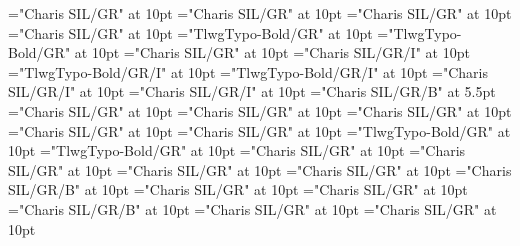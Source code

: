 \documentclass[a4paper,twoside]{article}
\begin{document}
\font\spanenetymologyentryletDatadicBody="Charis SIL/GR" at 10pt
\font\etymologyformenetymologyentryletDatadicBody="Charis SIL/GR" at 10pt
\font\spanenetymologyformenetymologyentryletDatadicBody="Charis SIL/GR" at 10pt
\font\translationsexamplessensesensesentryletDatadicBody="Charis SIL/GR" at 10pt
\font\translationpttranslationsexamplessensesensesentryletDatadicBody="TlwgTypo-Bold/GR" at 10pt
\font\spanpttranslationpttranslationsexamplessensesensesentryletDatadicBody="TlwgTypo-Bold/GR" at 10pt
\font\spanentranslationpttranslationsexamplessensesensesentryletDatadicBody="Charis SIL/GR" at 10pt
\font\grammaticalinfosensesentryletDatadicBody="Charis SIL/GR/I" at 10pt
\font\partofspeechptgrammaticalinfosensesentryletDatadicBody="TlwgTypo-Bold/GR/I" at 10pt
\font\spanptpartofspeechptgrammaticalinfosensesentryletDatadicBody="TlwgTypo-Bold/GR/I" at 10pt
\font\spanenpartofspeechptgrammaticalinfosensesentryletDatadicBody="Charis SIL/GR/I" at 10pt
\font\spanengrammaticalinfosensesentryletDatadicBody="Charis SIL/GR/I" at 10pt
\font\xhomographnumberheadwordsehentryletDatadicBody="Charis SIL/GR/B" at 5.5pt
\font{}="Charis SIL/GR" at 10pt
\font\spanendefinitionLcensensesensesentryletDatadicBody="Charis SIL/GR" at 10pt
\font\primaryrefsentryletDatadicBody="Charis SIL/GR" at 10pt
\font\spanenprimaryrefsentryletDatadicBody="Charis SIL/GR" at 10pt
\font\entryreftypeprimaryrefsentryletDatadicBody="Charis SIL/GR" at 10pt
\font\LexEntryTypepublishStemEntryTypeAbbreviationPubptentryreftypeprimaryrefsentryletDatadicBody="TlwgTypo-Bold/GR" at 10pt
\font\spanptLexEntryTypepublishStemEntryTypeAbbreviationPubptentryreftypeprimaryrefsentryletDatadicBody="TlwgTypo-Bold/GR" at 10pt
\font\spanenLexEntryTypepublishStemEntryTypeAbbreviationPubptentryreftypeprimaryrefsentryletDatadicBody="Charis SIL/GR" at 10pt
\font\spanenentryreftypeprimaryrefsentryletDatadicBody="Charis SIL/GR" at 10pt
\font\entryrefcomponentprimaryrefsentryletDatadicBody="Charis SIL/GR" at 10pt
\font\aentryrefcomponentprimaryrefsentryletDatadicBody="Charis SIL/GR" at 10pt
\font\LexEntrypublishStemComponentTargetHeadWordRefsehaentryrefcomponentprimaryrefsentryletDatadicBody="Charis SIL/GR/B" at 10pt
\font\subsensessensesensesentryletDatadicBody="Charis SIL/GR" at 10pt
\font\sensesubsensessensesensesentryletDatadicBody="Charis SIL/GR" at 10pt
\font\boldxsensenumbersensesubsensessensesensesentryletDatadicBody="Charis SIL/GR/B" at 10pt
\font{}="Charis SIL/GR" at 10pt
\font\spanendefinitionLcensensesubsensessensesensesentryletDatadicBody="Charis SIL/GR" at 10pt
\end{document}
